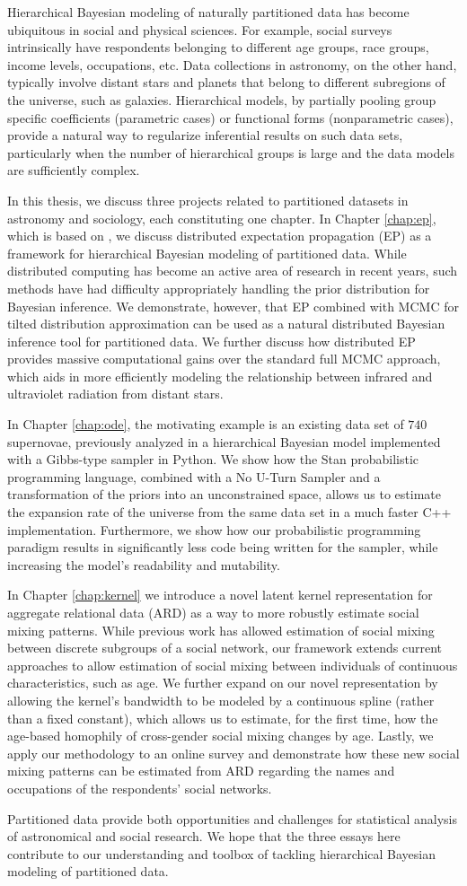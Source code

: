 Hierarchical Bayesian modeling of naturally partitioned data has become ubiquitous in social and physical sciences. For example, social surveys intrinsically have respondents belonging to different age groups, race groups, income levels, occupations, etc. Data collections in astronomy, on the other hand, typically involve distant stars and planets that belong to different subregions of the universe, such as galaxies. Hierarchical models, by partially pooling group specific coefficients (parametric cases) or functional forms (nonparametric cases), provide a natural way to regularize inferential results on such data sets, particularly when the number of hierarchical groups is large and the data models are sufficiently complex.

In this thesis, we discuss three projects related to partitioned datasets in astronomy and sociology, each constituting one chapter. In Chapter \ref{chap:ep}, which is based on \citep{Gelman+others:2017}, we discuss distributed expectation propagation (EP) as a framework for hierarchical Bayesian modeling of partitioned data. While distributed computing has become an active area of research in recent years, such methods have had difficulty appropriately handling the prior distribution for Bayesian inference. We demonstrate, however, that EP combined with MCMC for tilted distribution approximation can be used as a natural distributed Bayesian inference tool for partitioned data. We further discuss how distributed EP provides massive computational gains over the standard full MCMC approach, which aids in more efficiently modeling the relationship between infrared and ultraviolet radiation from distant stars. 

In Chapter \ref{chap:ode}, the motivating example is an existing data set of $740$ supernovae, previously analyzed in a hierarchical Bayesian model implemented with a Gibbs-type sampler in Python. We show how the Stan probabilistic programming language, combined with a No U-Turn Sampler and a transformation of the priors into an unconstrained space, allows us to estimate the expansion rate of the universe from the same data set in a much faster C++ implementation. Furthermore, we show how our probabilistic programming paradigm results in significantly less code being written for the sampler, while increasing the model's readability and mutability.

In Chapter \ref{chap:kernel} we introduce a novel latent kernel representation for aggregate relational data (ARD) as a way to more robustly estimate social mixing patterns. While previous work has allowed estimation of social mixing between discrete subgroups of a social network, our framework extends current approaches to allow estimation of social mixing between individuals of continuous characteristics, such as age. We further expand on our novel representation by allowing the kernel's bandwidth to be modeled by a continuous spline (rather than a fixed constant), which allows us to estimate, for the first time, how the age-based homophily of cross-gender social mixing changes by age. Lastly, we apply our methodology to an online survey and demonstrate how these new social mixing patterns can be estimated from ARD regarding the names and occupations of the respondents' social networks.  

Partitioned data provide both opportunities and challenges for statistical analysis of astronomical and social research. We hope that the three essays here contribute to our understanding and toolbox of tackling hierarchical Bayesian modeling of partitioned data.